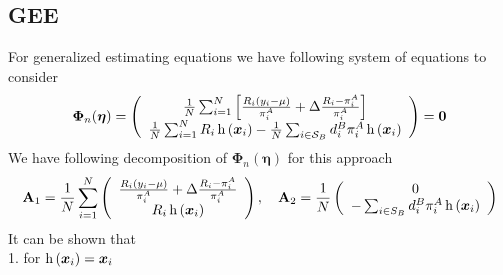 \documentclass[
  letterpaper,
  DIV=11,
  numbers=noendperiod]{scrreprt}
\begin{document}
\subsection{GEE}\label{gee}

For generalized estimating equations we have following system of
equations to consider \[
\begin{equation}
\boldsymbol{\Phi}_n(\boldsymbol{\eta})=\left(\begin{array}{c}
\frac{1}{N} \sum_{i=1}^N\left[\frac{R_i\left(y_i-\mu\right)}{\pi_i^A}+\Delta \frac{R_i-\pi_i^A}{\pi_i^A}\right] \\
\frac{1}{N} \sum_{i=1}^N R_i \operatorname{h}\left(\bx_i\right)-\frac{1}{N} \sum_{i \in \mathcal{S}_B} d_i^B \pi_i^A \operatorname{h}\left(\bx_i\right)
\end{array}\right)=\mathbf{0}
\end{equation}
\] We have following decomposition of
\(\boldsymbol{\Phi}_n(\boldsymbol{\eta})\) for this approach \[
\begin{equation}
\mathbf{A}_1=\frac{1}{N} \sum_{i=1}^N\left(\begin{array}{c}
\frac{R_i\left(y_i-\mu\right)}{\pi_i^A}+\Delta \frac{R_i-\pi_i^A}{\pi_i^A} \\
R_i \operatorname{h}\left(\bx_i\right)
\end{array}\right), \quad \mathbf{A}_2=\frac{1}{N}\left(\begin{array}{c}
0 \\
- \sum_{i \in S_B} d_i^B \pi_i^A \operatorname{h}\left(\bx_i\right)
\end{array}\right)
\end{equation}
\] It can be shown that\\
1. for \(\operatorname{h}\left(\boldsymbol{x}_i\right) = \boldsymbol{x}_i\)
\end{document}
